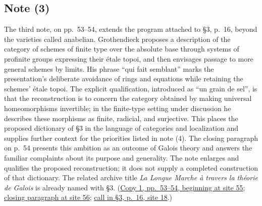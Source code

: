 \documentclass[11pt,a4paper]{article}
\begin{document}
\subsection*{Note (3)}
The third note, on pp.~53--54, extends the program attached to \S3,
p.~16, beyond the varieties called anabelian. Grothendieck proposes a
description of the category of schemes of finite type over the absolute
base through systems of profinite groups expressing their étale topoi,
and then envisages passage to more general schemes by limits. His phrase
``qui fait semblant'' marks the presentation's deliberate avoidance of
rings and equations while retaining the schemes' étale topoi. The
explicit qualification, introduced as ``un grain de sel'', is that the
reconstruction is to concern the category obtained by making universal
homeomorphisms invertible; in the finite-type setting under discussion
he describes these morphisms as finite, radicial, and surjective. This
places the proposed dictionary of \S3 in the language of categories and
localization and supplies further context for the priorities listed in
note (4). The closing paragraph on p.~54 presents this ambition as an
outcome of Galois theory and answers the familiar complaints about its
purpose and generality. The note enlarges and qualifies the proposed
reconstruction; it does not supply a completed construction of that
dictionary. The related archive title \emph{La Longue Marche à travers
la théorie de Galois} is already named with \S3.
(\href{https://grothendieck.umontpellier.fr/web/viewer.html?file=../119.pdf\#page=56}{Copy 1, pp.~53--54, beginning at site 55};
\href{https://grothendieck.umontpellier.fr/web/viewer.html?file=../119.pdf\#page=57}{closing paragraph at site 56};
\href{https://grothendieck.umontpellier.fr/web/viewer.html?file=../119.pdf\#page=19}{call in \S3, p.~16, site 18}.)
\end{document}
